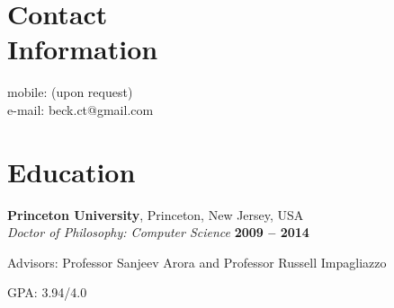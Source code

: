 \documentclass[margin,line]{resume}
\begin{document}
\begin{resume}

    \section{\mysidestyle Contact\\Information}

                                                          \hfill mobile: (upon request)          \vspace{0mm}\\\vspace{0mm}%
                                                          \hfill e-mail: beck.ct@gmail.com  \vspace{0mm}\\\vspace{-4.5mm}%





    \section{\mysidestyle Education}

    \textbf{Princeton University}, Princeton, New Jersey, USA \vspace{2mm}\\\vspace{1mm}%
    \textsl{Doctor of Philosophy: Computer Science} \hfill \textbf{ 2009 -- 2014 }\vspace{-3mm}\\\vspace{-1mm}%
    \begin{list2}
        \item Advisors:  Professor Sanjeev Arora and Professor Russell Impagliazzo
        \item GPA: 3.94/4.0
    \end{list2}\vspace{-1.5mm}


\end{resume}
\end{document}

